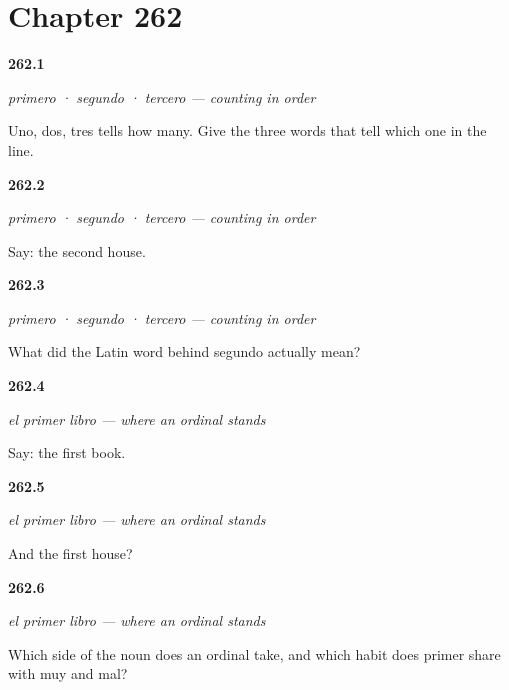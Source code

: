 \section*{Chapter 262}

\noindent\begin{minipage}[t]{\linewidth}
\raggedright
\hypertarget{review-ES-C67-primero-count}{\textbf{262.1}} \emph{primero · segundo · tercero — counting in order}\par
\small Uno, dos, tres tells how many. Give the three words that tell which one in the line.
\end{minipage}\par\medskip

\noindent\begin{minipage}[t]{\linewidth}
\raggedright
\hypertarget{review-ES-C67-primero-fem}{\textbf{262.2}} \emph{primero · segundo · tercero — counting in order}\par
\small Say: the second house.
\end{minipage}\par\medskip

\noindent\begin{minipage}[t]{\linewidth}
\raggedright
\hypertarget{review-ES-C67-primero-second}{\textbf{262.3}} \emph{primero · segundo · tercero — counting in order}\par
\small What did the Latin word behind segundo actually mean?
\end{minipage}\par\medskip

\noindent\begin{minipage}[t]{\linewidth}
\raggedright
\hypertarget{review-ES-C67-primer-libro-first}{\textbf{262.4}} \emph{el primer libro — where an ordinal stands}\par
\small Say: the first book.
\end{minipage}\par\medskip

\noindent\begin{minipage}[t]{\linewidth}
\raggedright
\hypertarget{review-ES-C67-primer-libro-fem}{\textbf{262.5}} \emph{el primer libro — where an ordinal stands}\par
\small And the first house?
\end{minipage}\par\medskip

\noindent\begin{minipage}[t]{\linewidth}
\raggedright
\hypertarget{review-ES-C67-primer-libro-third}{\textbf{262.6}} \emph{el primer libro — where an ordinal stands}\par
\small Which side of the noun does an ordinal take, and which habit does primer share with muy and mal?
\end{minipage}\par\medskip

